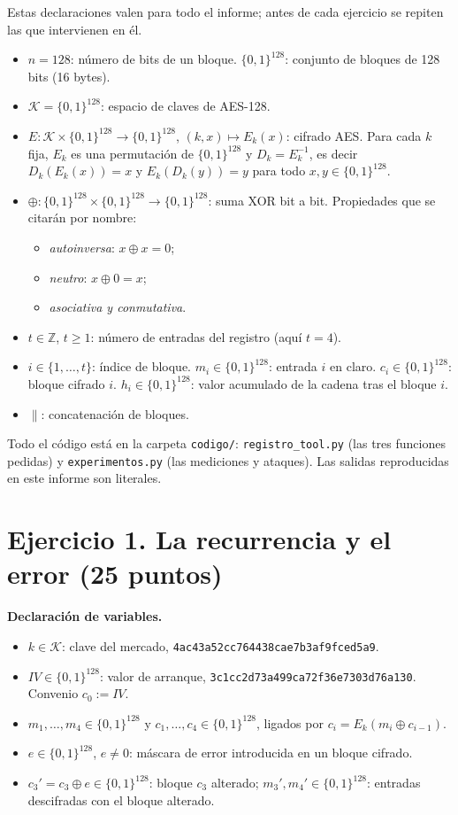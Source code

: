 \documentclass[11pt,letterpaper]{article}
\newcommand{\xor}{\oplus}
\newcommand{\B}{\{0,1\}^{128}}
\newenvironment{declaracion}{\par\medskip\noindent\textbf{Declaración de variables.}\begin{itemize}[leftmargin=1.5em,itemsep=1pt]}{\end{itemize}}
\begin{document}
Estas declaraciones valen para todo el informe; antes de cada ejercicio se repiten las que
intervienen en él.
\begin{itemize}[itemsep=1pt]
  \item $n = 128$: número de bits de un bloque. $\B$: conjunto de bloques de 128 bits (16 bytes).
  \item $\mathcal{K} = \B$: espacio de claves de AES-128.
  \item $E:\mathcal{K}\times\B\to\B$, $(k,x)\mapsto E_k(x)$: cifrado AES. Para cada $k$ fija,
        $E_k$ es una permutación de $\B$ y $D_k = E_k^{-1}$, es decir
        $D_k(E_k(x)) = x$ y $E_k(D_k(y)) = y$ para todo $x,y\in\B$.
  \item $\xor:\B\times\B\to\B$: suma XOR bit a bit. Propiedades que se citarán por nombre:
    \begin{itemize}[itemsep=0pt]
      \item[(X1)] \emph{autoinversa}: $x\xor x = 0$;
      \item[(X2)] \emph{neutro}: $x \xor 0 = x$;
      \item[(X3)] \emph{asociativa y conmutativa}.
    \end{itemize}
  \item $t\in\mathbb{Z}$, $t\ge 1$: número de entradas del registro (aquí $t=4$).
  \item $i\in\{1,\dots,t\}$: índice de bloque. $m_i\in\B$: entrada $i$ en claro.
        $c_i\in\B$: bloque cifrado $i$. $h_i\in\B$: valor acumulado de la cadena tras el bloque $i$.
  \item $\|$: concatenación de bloques.
\end{itemize}

Todo el código está en la carpeta \texttt{codigo/}: \texttt{registro\_tool.py} (las tres funciones
pedidas) y \texttt{experimentos.py} (las mediciones y ataques). Las salidas reproducidas en este
informe son literales.

\section{Ejercicio 1. La recurrencia y el error \hfill (25 puntos)}

\begin{declaracion}
  \item $k\in\mathcal{K}$: clave del mercado, \texttt{4ac43a52cc764438cae7b3af9fced5a9}.
  \item $IV\in\B$: valor de arranque, \texttt{3c1cc2d73a499ca72f36e7303d76a130}. Convenio $c_0 := IV$.
  \item $m_1,\dots,m_4\in\B$ y $c_1,\dots,c_4\in\B$, ligados por
        $c_i = E_k(m_i\xor c_{i-1})$.
  \item $e\in\B$, $e\neq 0$: máscara de error introducida en un bloque cifrado.
  \item $c_3' = c_3\xor e\in\B$: bloque $c_3$ alterado; $m_3', m_4'\in\B$: entradas descifradas con el bloque alterado.
\end{declaracion}
\end{document}
